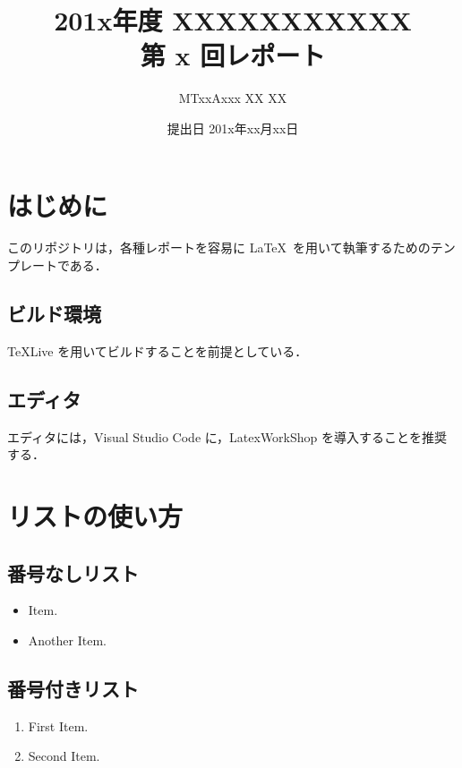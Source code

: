 \documentclass[a4j]{jarticle}
\title{
\vspace{-25mm}
201x年度 XXXXXXXXXXX\\第 x 回レポート}
\author{MTxxAxxx XX XX}
\date{提出日 201x年xx月xx日}
\begin{document}
\setcounter{page}{1}
\maketitle

\section{はじめに}
\label{cha:intro}
このリポジトリは，各種レポートを容易に \LaTeX\ を用いて執筆するためのテンプレートである．

\subsection{ビルド環境}
TeXLive \cite{TeXLive} を用いてビルドすることを前提としている．

\subsection{エディタ}
エディタには，Visual Studio Code \cite{VSCode} に，LatexWorkShop \cite{LaTeX-Workshop} を導入することを推奨する．

\section{リストの使い方}
\label{cha:list}
\subsection{番号なしリスト}
\begin{itemize}
    \item Item.
    \item Another Item.
\end{itemize}

\subsection{番号付きリスト}
\begin{enumerate}
    \item First Item.
    \item Second Item.
\end{enumerate}



\end{document}
